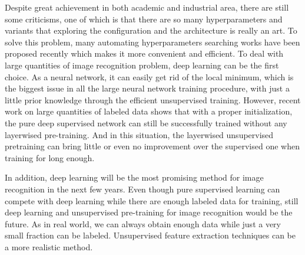 Despite great achievement in both academic and industrial area, there are still some criticisms, one of which is that there are so many hyperparameters and variants that exploring the configuration and the architecture is really an art\cite{LeCunBOM12}. To solve this problem, many automating hyperparameters searching works have been proposed recently which makes it more convenient and efficient\cite{BergstraB12}\cite{BergstraBBK11}\cite{snoek2012practical}. To deal with large quantities of image recognition problem, deep learning can be the first choice. As a neural network, it can easily get rid of the local  minimum, which is the biggest issue in all the large neural network training procedure, with just a little prior knowledge through the efficient unsupervised training. However, recent work on large quantities of labeled data shows that with a proper initialization, the pure deep supervised network can still be successfully trained without any layerwised pre-training\cite{cirecsan2010deep}\cite{glorot2011deep}\cite{seide2011conversational}. And in this situation, the layerwised unsupervised pretraining can bring little or even no improvement over the supervised one when training for long enough.

In addition, deep learning will be the most promising method for image recognition in the next few years. Even though pure supervised learning can compete with deep learning while there are enough labeled data for training, still deep learning and unsupervised pre-training for image recognition would be the future. As in real world, we can always obtain enough data while just a very small fraction can be labeled. Unsupervised feature extraction techniques can be a more realistic method. 

